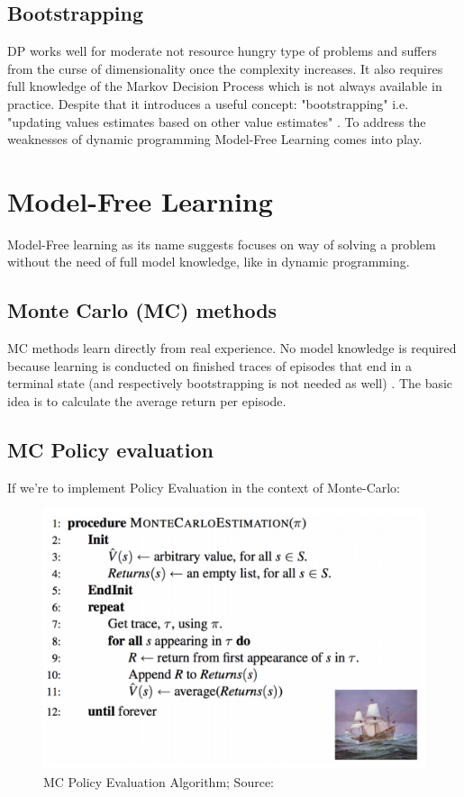 \subsection{Bootstrapping}

DP works well for moderate not resource hungry type of problems and suffers from the curse of dimensionality once the complexity increases. It also requires full knowledge of the Markov Decision Process which is not always available in practice. Despite that it introduces a useful concept: "bootstrapping" i.e. "updating values estimates based on other value estimates" \cite{lecture_dp}. To address the weaknesses
of dynamic programming Model-Free Learning comes into play.

\section{Model-Free Learning}
Model-Free learning as its name suggests focuses on way
of solving a problem without the need of full model knowledge,
like in dynamic programming. 
\subsection{Monte Carlo (MC) methods}

MC methods learn directly from real experience. No model knowledge is required because learning is conducted on finished traces of episodes that end in a terminal state (and respectively bootstrapping is not needed as well) \cite{lecture_mfl} . The basic idea is to calculate the average return per episode.

\subsection{MC Policy evaluation}
If we're to implement Policy Evaluation in the context of Monte-Carlo:
\begin{figure}[H]
  \centering
  \includegraphics[scale=0.5]{figures/mc_policy_evaluation.PNG}
  \caption{MC Policy Evaluation Algorithm; Source: \cite{lecture_mfl}}
  \label{fig:via}
\end{figure}

